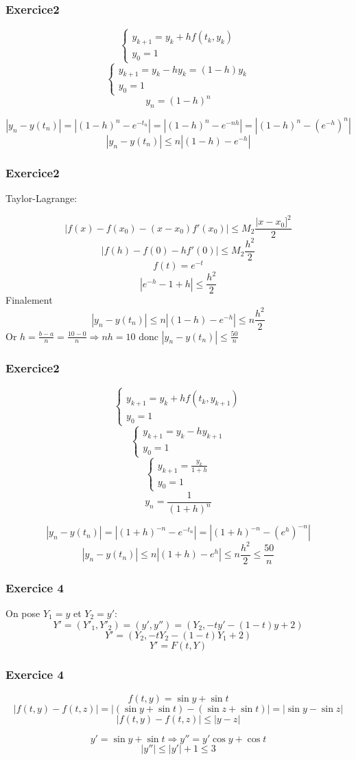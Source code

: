 \documentclass{beamer}
\begin{document}
 \begin{frame}
\frametitle{Exercice2}
 \[\left\{\begin{array}{l}
y_{k+1}=y_k+hf(t_k,y_{k})\\
y_0=1
\end{array}\right.\]
 \[\left\{\begin{array}{l}
y_{k+1}=y_k-hy_{k}=(1-h)y_k\\
y_0=1
\end{array}\right.\]
\[y_n=(1-h)^n\]


\[|y_n-y(t_n)|=|(1-h)^n-e^{-t_n}|=|(1-h)^n-e^{-nh}|=|(1-h)^n-(e^{-h})^n|\]
\[|y_n-y(t_n)|\leq n|(1-h)-e^{-h}|\]
  \end{frame}
   \begin{frame}
\frametitle{Exercice2}
Taylor-Lagrange:

\[|f(x)-f(x_0)-(x-x_0)f'(x_0)|\leq M_2\frac{|x-x_0]^2}2\]
\[|f(h)-f(0)-hf'(0)|\leq M_2\frac{h^2}2\]
\[f(t)=e^{-t}\]
\[|e^{-h}-1+h|\leq \frac{h^2}2\]
Finalement
\[|y_n-y(t_n)|\leq n|(1-h)-e^{-h}|\leq n  \frac{h^2}2\]
Or $h=\frac{b-a}{n}=\frac{10-0}{n} \Longrightarrow nh=10$ donc $|y_n-y(t_n)|\leq \frac{50}{n}$
  \end{frame}
  
   \begin{frame}
\frametitle{Exercice2}
 \[\left\{\begin{array}{l}
y_{k+1}=y_k+hf(t_k,y_{k+1})\\
y_0=1
\end{array}\right.\]
 \[\left\{\begin{array}{l}
y_{k+1}=y_k-hy_{k+1}\\
y_0=1
\end{array}\right.\]
\[\left\{\begin{array}{l}
y_{k+1}=\frac{y_k}{1+h}\\
y_0=1
\end{array}\right.\]
\[y_n=\frac 1{(1+h)^n}\]


\[|y_n-y(t_n)|=|(1+h)^{-n}-e^{-t_n}|=|(1+h)^{-n}-(e^{h})^{-n}|\]
\[|y_n-y(t_n)|\leq n|(1+h)-e^{h}|\leq n  \frac{h^2}2\leq \frac{50}{n}\]
  \end{frame}
  
  
  \begin{frame}
\frametitle{Exercice 4}
 On pose $Y_1=y$ et $Y_2=y'$:
 \[Y'=(Y'_1,Y'_2)=(y',y'')=(Y_2,-ty'-(1-t)y+2)\]
 \[Y'=(Y_2,-tY_2-(1-t)Y_1+2)\]
 \[Y'=F(t,Y)\]
  \end{frame}
  
   \begin{frame}
\frametitle{Exercice 4}
 \[f(t,y)=\sin y+\sin t\]
 \[|f(t,y)-f(t,z)|=|(\sin y+\sin t)-(\sin z+\sin t)|=|\sin y-\sin z|\]
  \[|f(t,y)-f(t,z)|\leq |y-z|\]
  
  \[y'=\sin y+\sin t \Longrightarrow y''=y'\cos y +\cos t\]
  \[|y''|\leq |y'|+1\leq 3\]
  \end{frame}
  
\end{document}
